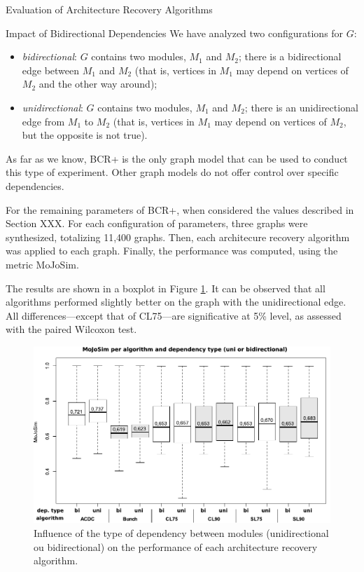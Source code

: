 \documentclass[11pt,twocolumn,a4paper,english]{article}
\begin{document}
\begin{section}{Evaluation of Architecture Recovery Algorithms}
\begin{subsection}{Impact of Bidirectional Dependencies}
	We have analyzed two configurations for $G$:
	
	\begin{itemize}
		\item \emph{bidirectional}: $G$ contains two modules, $M_1$ and $M_2$; there is a bidirectional edge between $M_1$ and $M_2$ (that is, vertices in $M_1$ may depend on vertices of $M_2$ and the other way around);
		
		\item \emph{unidirectional}: $G$ contains two modules, $M_1$ and $M_2$; there is an unidirectional edge from $M_1$ to $M_2$ (that is, vertices in $M_1$ may depend on vertices of $M_2$, but the opposite is not true).
	\end{itemize}
	
	As far as we know, BCR+ is the only graph model that can be used to conduct this type of experiment. Other graph models do not offer control over specific dependencies.
	
	For the remaining parameters of BCR+, when considered the values described in Section XXX. For each configuration of parameters, three graphs were synthesized, totalizing 11,400 graphs. Then, each architecure recovery algorithm was applied to each graph. Finally, the performance was computed, using the metric MoJoSim.
	
	The results are shown in a boxplot in Figure \ref{fig:exp-dependencies}. It can be observed that all algorithms performed slightly better on the graph with the unidirectional edge. All differences---except that of CL75---are significative at 5\% level, as assessed with the paired Wilcoxon test.
	
	\begin{figure}[htbp]
		\centering
			\includegraphics[scale=1]{figures/exp-dependencies}
		\caption{Influence of the type of dependency between modules (unidirectional ou bidirectional) on the performance of each architecture recovery algorithm.}
		\label{fig:exp-dependencies}
	\end{figure}
	

\end{subsection}
\end{section}
\end{document}
